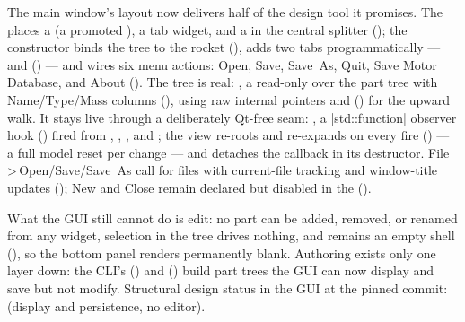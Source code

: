 The main window's layout now delivers half of the design tool it promises. The  places a
 (a promoted ), a tab widget, and a 
in the central splitter (); the constructor binds the tree to the rocket
(), adds two tabs programmatically ---  and
 () --- and wires six menu actions: Open, Save,
Save~As, Quit, Save Motor Database, and About (). The tree is real:
, a read-only  over the part tree with
Name/Type/Mass columns (), using raw  internal pointers
and  () for the upward walk. It stays live
through a deliberately Qt-free seam: , a
\cppinline|std::function| observer hook () fired from
, , , and ; the view re-roots and
re-expands on every fire () --- a full model reset per change ---
and detaches the callback in its destructor. File\,>\,Open/Save/Save~As call
 for  files with current-file tracking and window-title updates
(); New and Close remain declared but disabled in the 
().

\noindent What the GUI still cannot do is edit: no part can be added, removed, or renamed from any
widget, selection in the tree drives nothing, and  remains an empty
 shell (), so the bottom panel renders permanently
blank. Authoring exists only one layer down: the CLI's  ()
and  () build part trees the GUI can now display and save but
not modify. Structural design status in the GUI at the pinned commit: \fpartial{} (display and
persistence, no editor).

